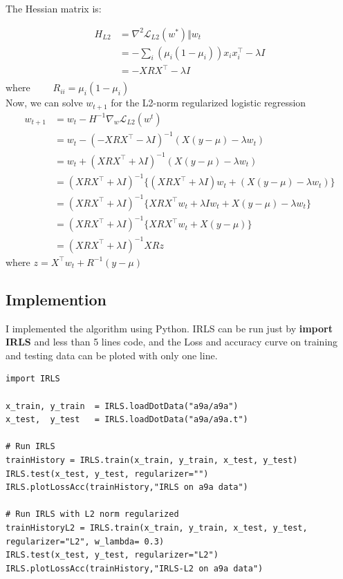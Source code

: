 \documentclass[a4paper]{article}
\begin{document}
The Hessian matrix is:

\begin{equation}
    \begin{aligned}
    H_{L2} &=\nabla^2{\mathcal{L}_{L2}(w^*)} \Vert w_t \\
    &= - \sum_{i}{(\mu_i(1-\mu_i))}x_i x_i^{\top} - \lambda I\\
    &= - XRX^{\top} - \lambda I\\
    \end{aligned}
\end{equation}
where $\qquad R_{ii} =\mu_i(1-\mu_i)$\\

Now, we can solve $w_{t+1}$ for the L2-norm regularized logistic regression
\begin{equation}
    \begin{aligned}
    w_{t+1} &=w_{t} - H^{-1} \nabla_w{\mathcal{L}_{L2}(w^t)}\\
    &= w_{t} - (-XRX^{\top} - \lambda I)^{-1}  (X(y-\mu) - \lambda w_t)\\
    &= w_{t} + (XRX^{\top} + \lambda I)^{-1}  (X(y-\mu) - \lambda w_t)\\
    &= (XRX^{\top} + \lambda I)^{-1} \{ (XRX^{\top} + \lambda I)w_t + (X(y-\mu) - \lambda w_t) \} \\
    &= (XRX^{\top} + \lambda I)^{-1} \{ XRX^{\top} w_t + \lambda I w_t + X(y-\mu) - \lambda w_t \}\\
    &= (XRX^{\top} + \lambda I)^{-1} \{ XRX^{\top} w_t + X(y-\mu) \}\\
    &=  (XRX^{\top} + \lambda I)^{-1} XRz
    \end{aligned}
\end{equation}
where $z=X^{\top} w_t + R^{-1}(y-\mu)$


\subsection{Implemention}

 I implemented the algorithm using Python. IRLS can be run just by \textbf{import IRLS} and less than 5 lines code, and the Loss and accuracy curve on training and testing data can be ploted with only one line.



\begin{verbatim}
import IRLS

x_train, y_train  = IRLS.loadDotData("a9a/a9a")
x_test,  y_test   = IRLS.loadDotData("a9a/a9a.t")

# Run IRLS
trainHistory = IRLS.train(x_train, y_train, x_test, y_test)
IRLS.test(x_test, y_test, regularizer="")
IRLS.plotLossAcc(trainHistory,"IRLS on a9a data")

# Run IRLS with L2 norm regularized
trainHistoryL2 = IRLS.train(x_train, y_train, x_test, y_test, regularizer="L2", w_lambda= 0.3)
IRLS.test(x_test, y_test, regularizer="L2")
IRLS.plotLossAcc(trainHistory,"IRLS-L2 on a9a data")
\end{verbatim}
\end{document}

